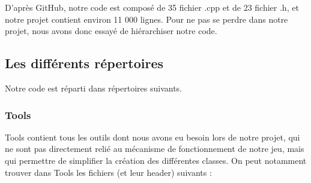 \documentclass[a4paper,twoside, openany,11pt]{book}
\begin{document}
D'après GitHub, notre code est composé de 35 fichier .cpp et de 23 fichier .h, et notre projet contient environ 11 000 lignes. Pour ne pas se perdre dans notre projet, nous avons donc essayé de hiérarchiser notre code. 

\subsection{Les différents répertoires}
Notre code est réparti dans répertoires suivants.
\subsubsection{Tools}
Tools contient tous les outils dont nous avons eu besoin lors de notre projet, qui ne sont pas directement relié au mécanisme de fonctionnement de notre jeu, mais qui permettre de simplifier la création des différentes classes. On peut notamment trouver dans Tools les fichiers (et leur header) suivants :
\end{document}
